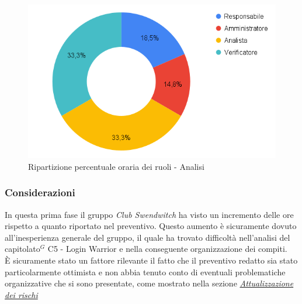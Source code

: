 \begin{figure}[h!]
	\centering
	\includegraphics[scale=0.37]{../../assets/Diagrammi_Excel/torta_ore_Analisi.png}
	\caption{Ripartizione percentuale oraria dei ruoli - Analisi}
\end{figure}

\subsubsection{Considerazioni}
In questa prima fase il gruppo \textit{Club Swendwitch} ha visto un incremento delle ore rispetto a quanto riportato nel preventivo. Questo aumento è sicuramente dovuto all'inesperienza generale del gruppo, il quale ha trovato difficoltà nell'analisi del capitolato$^G$  C5 - Login Warrior e nella conseguente organizzazione dei compiti.\\
È sicuramente stato un fattore rilevante il fatto che il preventivo redatto sia stato particolarmente ottimista e non abbia tenuto conto di eventuali problematiche organizzative che si sono presentate, come mostrato nella sezione \hyperref[sec:AttualizzazioneRischi]{\textit{Attualizzazione dei rischi}}

